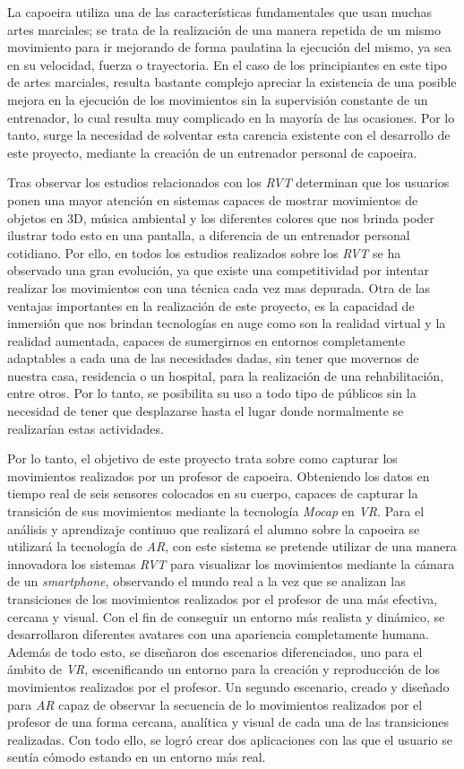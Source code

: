 La capoeira utiliza una de las características fundamentales que usan muchas artes marciales; se trata de la realización de una manera repetida de un mismo movimiento para ir mejorando de forma paulatina la ejecución del mismo, ya sea en su velocidad, fuerza o trayectoria. En el caso de los principiantes en este tipo de artes marciales, resulta bastante complejo apreciar la existencia de una posible mejora en la ejecución de los movimientos sin la supervisión constante de un entrenador, lo cual resulta muy complicado en la mayoría de las ocasiones. Por lo tanto, surge la necesidad de solventar esta carencia existente con el desarrollo de este proyecto, mediante la creación de un entrenador personal de capoeira.

Tras observar los estudios relacionados con los \textit{RVT} determinan que los usuarios ponen una mayor atención en sistemas capaces de mostrar movimientos de objetos en 3D, música ambiental y los diferentes colores que nos brinda poder ilustrar todo esto en una pantalla, a diferencia de un entrenador personal cotidiano. Por ello, en todos los estudios realizados sobre los \textit{RVT} se ha observado una gran evolución, ya que existe una competitividad por intentar realizar los movimientos con una técnica cada vez mas depurada. Otra de las ventajas importantes en la realización de este proyecto, es la capacidad de inmersión que nos brindan tecnologías en auge como son la realidad virtual y la realidad aumentada, capaces de sumergirnos en entornos completamente adaptables a cada una de las necesidades dadas, sin tener que movernos de nuestra casa, residencia o un hospital, para la realización de una rehabilitación, entre otros. Por lo tanto, se posibilita su uso a todo tipo de públicos sin la necesidad de tener que desplazarse hasta el lugar donde normalmente se realizarían estas actividades.

Por lo tanto, el objetivo de este proyecto trata sobre como capturar los movimientos realizados por un profesor de capoeira. Obteniendo los datos en tiempo real de seis sensores colocados en su cuerpo, capaces de capturar la transición de sus movimientos mediante la tecnología \textit{Mocap} en \textit{VR}. Para el análisis y aprendizaje continuo que realizará el alumno sobre la capoeira se utilizará la tecnología de \textit{AR}, con este sistema se pretende utilizar de una manera innovadora los sistemas \textit{RVT} para visualizar los movimientos mediante la cámara de un \textit{smartphone}, observando el mundo real a la vez que se analizan las transiciones de los movimientos realizados por el profesor de una más efectiva, cercana y visual. Con el fin de conseguir un entorno más realista y dinámico, se desarrollaron diferentes avatares con una apariencia completamente humana. Además de todo esto, se diseñaron dos escenarios diferenciados, uno para el ámbito de \textit{VR}, escenificando un entorno para la creación y reproducción de los movimientos realizados por el profesor. Un segundo escenario, creado y diseñado para \textit{AR} capaz de observar la secuencia de lo movimientos realizados por el profesor de una forma cercana, analítica y visual de cada una de las transiciones realizadas. Con todo ello, se logró crear dos aplicaciones con las que el usuario se sentía cómodo estando en un entorno más real.

